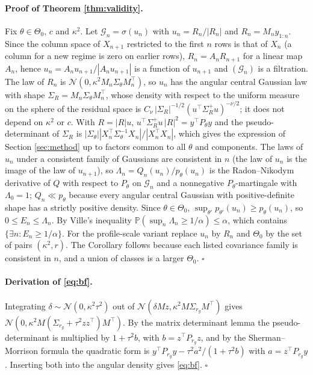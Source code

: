 \documentclass[11pt]{article}
\theoremstyle{plain}
\theoremstyle{definition}
\newcommand{\Prob}{\mathbb{P}}
\begin{document}
\paragraph{Proof of Theorem \ref{thm:validity}.} Fix $\theta\in\Theta_0$, $c$ and $\kappa^2$. Let $\mathcal{G}_n=\sigma(u_n)$ with $u_n=R_n/|R_n|$ and $R_n=M_ny_{1:n}$. Since the column space of $X_{n+1}$ restricted to the first $n$ rows is that of $X_n$ (a column for a new regime is zero on earlier rows), $R_n=A_nR_{n+1}$ for a linear map $A_n$, hence $u_n=A_nu_{n+1}/|A_nu_{n+1}|$ is a function of $u_{n+1}$ and $(\mathcal{G}_n)$ is a filtration. The law of $R_n$ is $\mathcal{N}(0,\kappa^2M_n\Sigma_\theta M_n^\top)$, so $u_n$ has the angular central Gaussian law with shape $\Sigma_R=M_n\Sigma_\theta M_n^\top$, whose density with respect to the uniform measure on the sphere of the residual space is $C_\nu\,|\Sigma_{R}|^{-1/2}(u^\top\Sigma_R^{+}u)^{-\nu/2}$; it does not depend on $\kappa^2$ or $c$. With $R=|R|u$, $u^\top\Sigma_R^+u\,|R|^2=y^\top P_\theta y$ and the pseudo-determinant of $\Sigma_R$ is $|\Sigma_\theta||X_n^\top\Sigma_\theta^{-1}X_n|/|X_n^\top X_n|$, which gives the expression of Section \ref{sec:method} up to factors common to all $\theta$ and components. The laws of $u_n$ under a consistent family of Gaussians are consistent in $n$ (the law of $u_n$ is the image of the law of $u_{n+1}$), so $\Lambda_n=Q_n(u_n)/p_\theta(u_n)$ is the Radon--Nikodym derivative of $Q$ with respect to $P_\theta$ on $\mathcal{G}_n$ and a nonnegative $P_\theta$-martingale with $\Lambda_0=1$; $Q_n\ll p_\theta$ because every angular central Gaussian with positive-definite shape has a strictly positive density. Since $\theta\in\Theta_0$, $\sup_{\theta'}p_{\theta'}(u_n)\ge p_\theta(u_n)$, so $0\le E_n\le\Lambda_n$. By Ville's inequality $\Prob(\sup_n\Lambda_n\ge1/\alpha)\le\alpha$, which contains $\{\exists n:E_n\ge1/\alpha\}$. For the profile-scale variant replace $u_n$ by $R_n$ and $\Theta_0$ by the set of pairs $(\kappa^2,r)$. The Corollary follows because each listed covariance family is consistent in $n$, and a union of classes is a larger $\Theta_0$. $\square$

\paragraph{Derivation of \eqref{eq:bf}.} Integrating $\delta\sim\mathcal{N}(0,\kappa^2\tau^2)$ out of $\mathcal{N}(\delta M z,\kappa^2M\Sigma_{r_g}M^\top)$ gives $\mathcal{N}(0,\kappa^2 M(\Sigma_{r_g}+\tau^2zz^\top)M^\top)$. By the matrix determinant lemma the pseudo-determinant is multiplied by $1+\tau^2b$, with $b=z^\top P_{r_g}z$, and by the Sherman--Morrison formula the quadratic form is $y^\top P_{r_g}y-\tau^2a^2/(1+\tau^2b)$ with $a=z^\top P_{r_g}y$. Inserting both into the angular density gives \eqref{eq:bf}. $\square$
\end{document}
